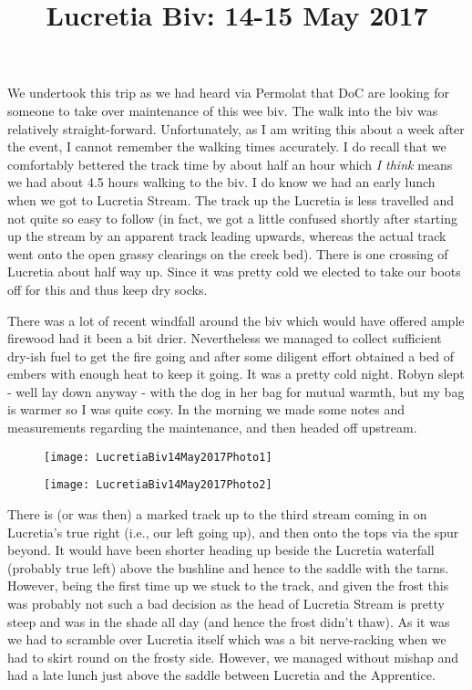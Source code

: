 \documentclass[12pt]{article} %
\title{Lucretia Biv: 14-15 May 2017}
\makeatletter
\renewcommand{\maketitle}{%
  {\bfseries{\scshape{\Large{\@title\par}}}}
}
\makeatother
\begin{document}
  \maketitle
We undertook this trip as we had heard via Permolat that DoC are looking for someone to take over maintenance of this wee biv.  The walk into the biv was relatively straight-forward.  Unfortunately, as I am writing this about a week after the event, I cannot remember the walking times accurately.  I do recall that we comfortably bettered the track time by about half an hour which \textit{I think} means we had about 4.5 hours walking to the biv.  I do know we had an early lunch when we got to Lucretia Stream.  The track up the Lucretia is less travelled and not quite so easy to follow (in fact, we got a little confused shortly after starting up the stream by an apparent track leading upwards, whereas the actual track went onto the open grassy clearings on the creek bed).  There is one crossing of Lucretia about half way up.  Since it was pretty cold we elected to take our boots off for this and thus keep dry socks.

There was a lot of recent windfall around the biv which would have offered ample firewood had it been a bit drier.  Nevertheless we managed to collect sufficient dry-ish fuel to get the fire going and after some diligent effort obtained a bed of embers with enough heat to keep it going.  It was a pretty cold night.  Robyn slept - well lay down anyway - with the dog in her bag for mutual warmth, but my bag is warmer so I was quite cosy.  In the morning we made some notes and measurements regarding the maintenance, and then headed off upstream.

\begin{figure}[ht]
\begin{minipage}{.45\linewidth}
\begin{flushleft}
   \texttt{[image: LucretiaBiv14May2017Photo1]}
\end{flushleft}
\end{minipage}
\begin{minipage}{.55\linewidth}
\begin{flushright}
    \texttt{[image: LucretiaBiv14May2017Photo2]}
\end{flushright}
\end{minipage}
\end{figure}

There is (or was then) a marked track up to the third stream coming in on Lucretia's true right (i.e., our left going up), and then onto the tops via the spur beyond.  It would have been shorter heading up beside the Lucretia waterfall (probably true left) above the bushline and hence to the saddle with the tarns.  However, being the first time up we stuck to the track, and given the frost this was probably not such a bad decision as the head of Lucretia Stream is pretty steep and was in the shade all day (and hence the frost didn't thaw).  As it was we had to scramble over Lucretia itself which was a bit nerve-racking when we had to skirt round on the frosty side.  However, we managed without mishap and had a late lunch just above the saddle between Lucretia and the Apprentice.
\end{document}
